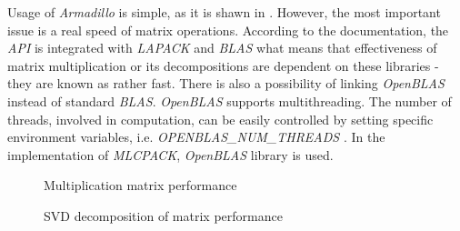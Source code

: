 Usage of \textit{Armadillo} is simple, as it is shawn in . However, the most important issue is a real speed of matrix operations. According to the documentation, the \textit{API} is integrated with \textit{LAPACK} and \textit{BLAS} what means that effectiveness of matrix multiplication or its decompositions are dependent on these libraries - they are known as rather fast. There is also a possibility of linking \textit{OpenBLAS} instead of standard \textit{BLAS}. \textit{OpenBLAS} supports multithreading. The number of threads, involved in computation, can be easily controlled by setting specific environment variables, i.e. \textit{OPENBLAS\_NUM\_THREADS} \cite{Blas}. In the implementation of \textit{MLCPACK}, \textit{OpenBLAS} library is used.    

\begin{figure}[h]
\centering
\caption{Multiplication matrix performance}
\label{fig:mulperf}
\end{figure}

\begin{figure}
\centering
\caption{SVD decomposition of matrix performance}
\label{fig:svdperf}
\end{figure}


